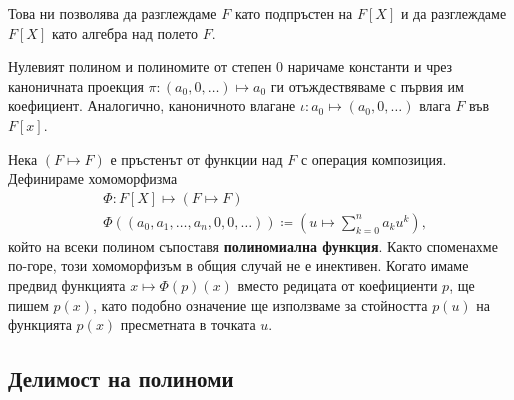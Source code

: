 \documentclass[
  headings=standardclasses,
  bibliography=totocnumbered,
]{scrartcl}
\begin{document}
Това ни позволява да разглеждаме \( F \) като подпръстен на \( F[X] \) и да разглеждаме \( F[X] \) като алгебра над полето \( F \).

Нулевият полином и полиномите от степен \( 0 \) наричаме константи и чрез каноничната проекция \( \pi: (a_0, 0, \ldots) \mapsto a_0 \) ги отъждествяваме с първия им коефициент. Аналогично, каноничното влагане \( \iota: a_0 \mapsto (a_0, 0, \ldots) \) влага \( F \) във \( F[x] \).

Нека \( (F \mapsto F) \) е пръстенът от функции над \( F \) с операция композиция. Дефинираме хомоморфизма
\begin{align*}
  &\Phi: F[X] \mapsto (F \mapsto F) \\
  &\Phi\left((a_0, a_1, \ldots, a_n, 0, 0, \ldots) \right) \coloneqq \left( u \mapsto \sum_{k=0}^n a_k u^k \right),
\end{align*}
който на всеки полином съпоставя \textbf{полиномиална функция}. Както споменахме по-горе, този хомоморфизъм в общия случай не е инективен. Когато имаме предвид функцията \( x \mapsto \Phi(p)(x) \) вместо редицата от коефициенти \( p \), ще пишем \( p(x) \), като подобно означение ще използваме за стойността \( p(u) \) на функцията \( p(x) \) пресметната в точката \( u \).

\subsection{Делимост на полиноми}
\end{document}
